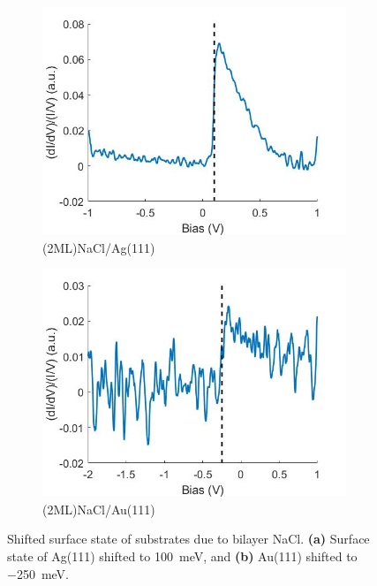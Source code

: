 \begin{figure} [H]
    \centering
    \begin{subfigure}[t]{0.49\textwidth}
    \includegraphics[width=\textwidth]{pictures/2mlnacl_ag111_surface_state.jpg}
    \caption{(2ML)NaCl/Ag(111)}
    \end{subfigure}
    \hfill
    \begin{subfigure}[t]{0.48\textwidth}
    \includegraphics[width=\textwidth]{pictures/2mlnacl_au111_surface_state.jpg}
    \caption{(2ML)NaCl/Au(111)}
    \end{subfigure}
    
    \caption{Shifted surface state of substrates due to bilayer NaCl. \textbf{(a)} Surface state of Ag(111) shifted to \SI{+100}{meV}, and \textbf{(b)} Au(111) shifted to \SI{-250}{meV}.}
    \label{fig:expsetup:NaClstate}
\end{figure}

